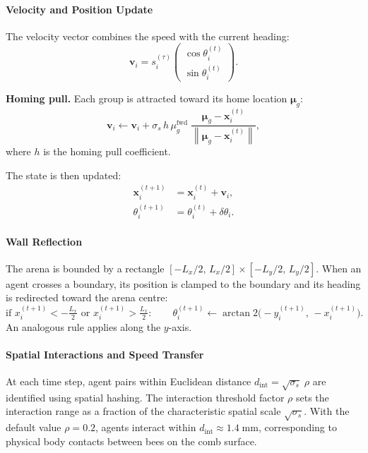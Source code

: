 \documentclass{article}
\newcommand{\vect}[1]{\mathbf{#1}}
\newcommand{\norm}[1]{\left\lVert #1 \right\rVert}
\begin{document}
{\paragraph{Velocity and Position Update}

The velocity vector combines the speed with the current heading:
%
\begin{equation}
  \vect{v}_i = s_i^{(\tau)} \begin{pmatrix} \cos\theta_i^{(t)} \\ \sin\theta_i^{(t)} \end{pmatrix}.
\end{equation}

\textbf{Homing pull.}
Each group is attracted toward its home location $\vect{\mu}_g$:
%
\begin{equation}
  \vect{v}_i \leftarrow \vect{v}_i
    + \sigma_s \, h \, \mu_g^{\mathrm{fwd}}
      \;\frac{\vect{\mu}_g - \vect{x}_i^{(t)}}
             {\norm{\vect{\mu}_g - \vect{x}_i^{(t)}}},
\end{equation}
%
where $h$ is the homing pull coefficient.

The state is then updated:
%
\begin{align}
  \vect{x}_i^{(t+1)} &= \vect{x}_i^{(t)} + \vect{v}_i, \\
  \theta_i^{(t+1)}    &= \theta_i^{(t)} + \delta\theta_i.
\end{align}

\paragraph{Wall Reflection}

The arena is bounded by a rectangle
$[{-L_x/2},\, {L_x/2}] \times [{-L_y/2},\, {L_y/2}]$.
When an agent crosses a boundary, its position is clamped to the boundary and
its heading is redirected toward the arena centre:
%
\begin{equation}
  \text{if } x_i^{(t+1)} < -\tfrac{L_x}{2} \text{ or } x_i^{(t+1)} > \tfrac{L_x}{2}:
  \qquad
  \theta_i^{(t+1)} \leftarrow \arctan2\!\bigl(-y_i^{(t+1)},\, -x_i^{(t+1)}\bigr).
\end{equation}
%
An analogous rule applies along the $y$-axis.

\paragraph{Spatial Interactions and Speed Transfer}

At each time step, agent pairs within Euclidean distance
$d_{\mathrm{int}} = \sqrt{\sigma_s}\;\rho$ are identified using spatial
hashing.  The interaction threshold factor $\rho$ sets the interaction range
as a fraction of the characteristic spatial scale $\sqrt{\sigma_s}$.  With the
default value $\rho = 0.2$, agents interact within
$d_{\mathrm{int}} \approx 1.4\;\mathrm{mm}$, corresponding to physical body
contacts between bees on the comb surface.

}
\end{document}
